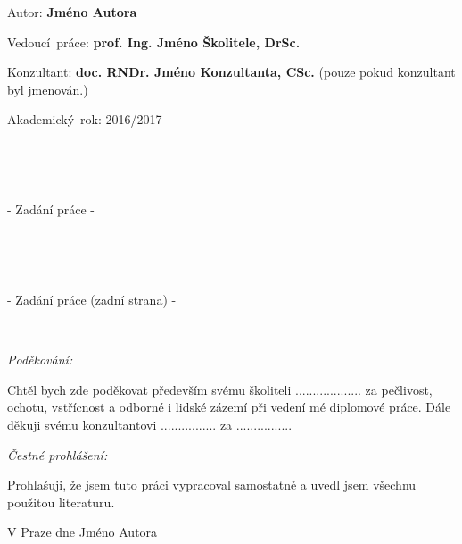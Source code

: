 \documentclass[a4paper,11pt]{book}
\begin{document}
\vfill{}

\begin{list}{}{
	\settowidth{\labelwidth}{MMMMMMMMM}
 \setlength{\leftmargin}{\labelwidth}
 \addtolength{\leftmargin}{\labelsep}
	\renewcommand{\makelabel}[1]{#1\hfil}}
\item [{Autor:}] \textbf{Jméno Autora}
\item [{Vedoucí~práce:}] \textbf{prof. Ing. Jméno Školitele, DrSc.}
\item [{Konzultant:}] \textbf{doc. RNDr. Jméno Konzultanta, CSc. }(pouze
pokud konzultant byl jmenován.)
\item [{Akademický~rok:}] 2016/2017

\end{list}
\newpage{}

~\newpage{}

~

\vfill{}


\begin{center}
- Zadání práce -
\par\end{center}

\vfill{}


~\newpage{}

~

\vfill{}


\begin{center}
- Zadání práce (zadní strana) -
\par\end{center}

\vfill{}


~\newpage{}

\noindent \emph{\Large{}Poděkování:}{\Large \par}

\noindent Chtěl bych zde poděkovat především svému školiteli ...................
za pečlivost, ochotu, vstřícnost a odborné i lidské zázemí při vedení
mé diplomové práce. Dále děkuji svému konzultantovi ................
za ................

\vfill

\noindent \emph{\Large{}Čestné prohlášení:}{\Large \par}

\noindent Prohlašuji, že jsem tuto práci vypracoval samostatně a uvedl
jsem všechnu použitou literaturu.

\bigskip{}


\noindent V Praze dne \documentdate\hfill{}Jméno Autora

\vspace{2cm}
\end{document}
